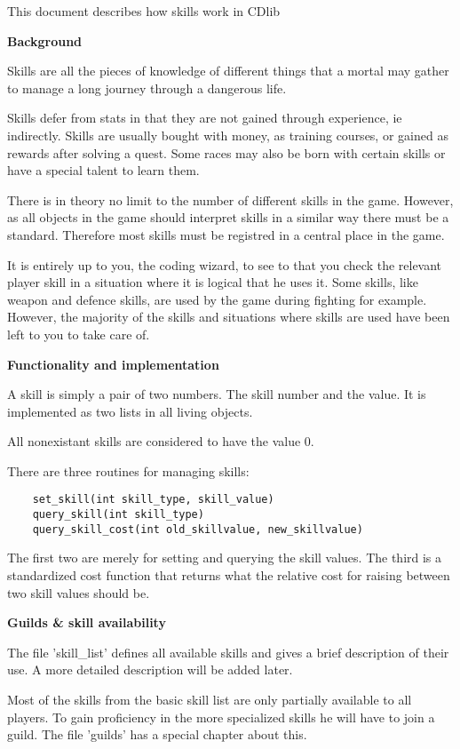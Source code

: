 This document describes how skills work in CDlib

{\bf Background}


Skills are all the pieces of knowledge of different things that a mortal may
gather to manage a long journey through a dangerous life.
    
Skills defer from stats in that they are not gained through experience, ie
indirectly. Skills are usually bought with money, as training courses, or
gained as rewards after solving a quest. Some races may also be born with
certain skills or have a special talent to learn them.

There is in theory no limit to the number of different skills in the game.
However, as all objects in the game should interpret skills in a similar
way there must be a standard. Therefore most skills must be registred in
a central place in the game.

It is entirely up to you, the coding wizard, to see to that you check the
relevant player skill in a situation where it is logical that he uses it.
Some skills, like weapon and defence skills, are used by the game during
fighting for example. However, the majority of the skills and situations
where skills are used have been left to you to take care of.

{\bf Functionality and implementation}


A skill is simply a pair of two numbers. The skill number and the value.
It is implemented as two lists in all living objects. 

All nonexistant skills are considered to have the value 0.

There are three routines for managing skills:

\begin{verbatim}
    set_skill(int skill_type, skill_value)
    query_skill(int skill_type)
    query_skill_cost(int old_skillvalue, new_skillvalue)
\end{verbatim}

The first two are merely for setting and querying the skill values. The third
is a standardized cost function that returns what the relative cost for 
raising between two skill values should be.

{\bf Guilds \& skill availability}


The file 'skill\_list' defines all available skills and gives a brief
description of their use. A more detailed description will be added later.

Most of the skills from the basic skill list are only partially available
to all players. To gain proficiency in the more specialized skills he will
have to join a guild. The file 'guilds' has a special chapter about this.

